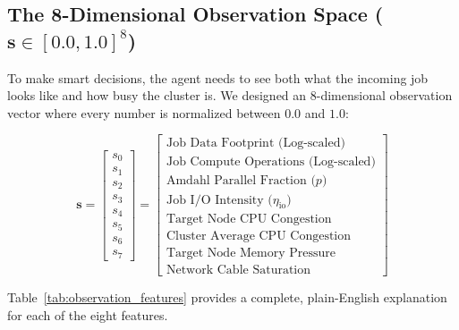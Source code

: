 \documentclass[11pt,a4paper]{article}
\begin{document}
\subsection{The 8-Dimensional Observation Space \texorpdfstring{($\mathbf{s} \in [0.0, 1.0]^8$)}{(s in [0, 1])}}
To make smart decisions, the agent needs to see both what the incoming job looks like and how busy the cluster is. We designed an 8-dimensional observation vector where every number is normalized between $0.0$ and $1.0$:

\begin{equation}
    \mathbf{s} = \begin{bmatrix}
        s_0 \\ s_1 \\ s_2 \\ s_3 \\ s_4 \\ s_5 \\ s_6 \\ s_7
    \end{bmatrix} = \begin{bmatrix}
        \text{Job Data Footprint (Log-scaled)} \\
        \text{Job Compute Operations (Log-scaled)} \\
        \text{Amdahl Parallel Fraction ($p$)} \\
        \text{Job I/O Intensity ($\eta_{\text{io}}$)} \\
        \text{Target Node CPU Congestion} \\
        \text{Cluster Average CPU Congestion} \\
        \text{Target Node Memory Pressure} \\
        \text{Network Cable Saturation}
    \end{bmatrix}
\end{equation}

Table~\ref{tab:observation_features} provides a complete, plain-English explanation for each of the eight features.
\end{document}

